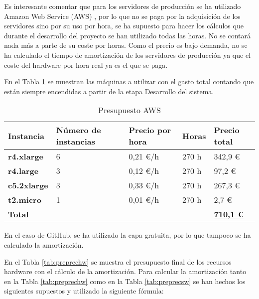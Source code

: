 Es interesante comentar que para los servidores de producción se ha utilizado Amazon Web Service (AWS) \cite{Tfg:aws}, por lo que no se paga por la adquisición de los servidores sino por su uso por hora, se ha supuesto para hacer los cálculos que durante el desarrollo del proyecto se han utilizado todas las horas. No se contará nada más a parte de su coste por horas. Como el precio es bajo demanda, no se ha calculado el tiempo de amortización de los servidores de producción ya que el coste del hardware por hora real ya es el que se paga. 

En el Tabla \ref{tab:prepaws} se muestran las máquinas a utilizar con el gasto total contando que están siempre encendidas a partir de la etapa Desarrollo del sistema.

\begin{table}[H]\label{tab:prepaws}
	\centering
	\begin{tabular}{|l|l|l|l|l|}
		\hline
		\textbf{Instancia}  & \textbf{Número de instancias} & \textbf{Precio por hora} & \textbf{Horas} & \textbf{Precio total} \\ \hline
		\textbf{r4.xlarge}  & 6                             & 0,21 €/h \cite{Tfg:ec2price} & 270 h          & 342,9 €               \\ \hline
		\textbf{r4.large}   & 3                             & 0,12 €/h \cite{Tfg:ec2price} & 270 h          & 97,2 €                \\ \hline
		\textbf{c5.2xlarge} & 3                             & 0,33 €/h \cite{Tfg:ec2price} & 270 h          & 267,3 €               \\ \hline
		\textbf{t2.micro}   & 1                             & 0,01 €/h \cite{Tfg:ec2price} & 270 h          & 2,7 €                 \\ \hline
		\multicolumn{4}{|l|}{\textbf{Total}} & \textbf{\underline{710,1 €}}                                                   \\ \hline
	\end{tabular}
	\caption{Presupuesto AWS}
\end{table}

En el caso de GitHub, se ha utilizado la capa gratuita, por lo que tampoco se ha calculado la amortización.

En el Tabla \ref{tab:preprechw} se muestra el presupuesto final de los recursos hardware con el cálculo de la amortización. Para calcular la amortización tanto en la Tabla \ref{tab:preprechw} como en la Tabla \ref{tab:preprecsw} se han hechos los siguientes supuestos y utilizado la siguiente fórmula:

